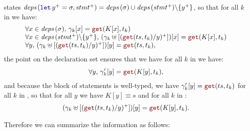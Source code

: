 \begin{skippableproof}
\begin{itemize}
\begin{itemize}
                         states
                        $\depSet{\decl{y^+}{\sigma}, stmt^+} = \depSet{\sigma} \cup \depSet{stmt^+}
                            \backslash \{y^+\}$, so that for all $k$ in \N we have:
                        \begin{equation*}
                            \begin{array}{l}
                                \forall x \in \depSet{\sigma}, \, \gamma_k[x] = \getAt{K[x]}{t_k}                                                          \\
                                \forall x \in \depSet{stmt^+} \backslash \{y^+\}, \, (\gamma_k \ctxconcat [(\getAt{\ts}{t_k}/y)^+])[x] = \getAt{K[x]}{t_k} \\
                                \forall y, \, (\gamma_k \ctxconcat [(\getAt{\ts}{t_k}/y)^+])[y] = \getAt{\ts}{t_k},
                            \end{array}
                        \end{equation*}
                        the point on the declaration set ensures that we have for all $k$ in \N we have:
                        \begin{equation*}
                            \forall y, \, \gamma'_k[y] = \getAt{K[y]}{t_k},
                        \end{equation*}
                        and because the block of statements is well-typed, we have $\gamma'_k[y] =
                            \getAt{\ts}{t_k}$ for all $k$ in \N, so that for all $y$ we have $K[y]
                            \equiv s$ and for all $k$ in \N:
                        \begin{equation*}
                            (\gamma_k \ctxconcat [(\getAt{\ts}{t_k}/y)^+])[y] = \getAt{K[y]}{t_k}.
                        \end{equation*}

                        Therefore we can summarize the information as follows:


\end{itemize}
\end{itemize}
\end{skippableproof}
